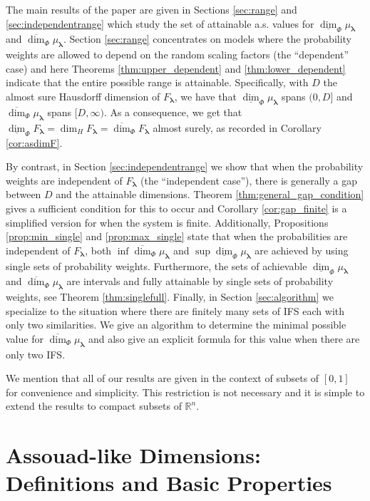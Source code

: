 \documentclass{amsart}
\theoremstyle{plain}
\numberwithin{equation}{section}
\newcommand{\R}{{\mathbb R}}
\newcommand{\blambda}{{\boldsymbol{\lambda}}}
\newcommand{\odim}{\overline{\dim}}
\newcommand{\udim}{\underline{\dim}}
\begin{document}
The main results of the paper are given in Sections \ref{sec:range} and \ref{sec:independentrange} which study the set of attainable a.s. values for $\udim_\Phi \mu_\blambda$ and $\odim_\Phi \mu_\blambda$.
Section \ref{sec:range} concentrates on models where the probability weights are allowed to depend on the random scaling factors (the ``dependent'' case) and here 
Theorems \ref{thm:upper_dependent} and \ref{thm:lower_dependent} indicate that the entire possible range is attainable.
Specifically, with $D$ the almost sure Hausdorff dimension of $F_\blambda$, we have that $\udim_\Phi \mu_\blambda$ spans $(0,D]$ and $\odim_\Phi \mu_\blambda$ spans $[D,\infty)$.
As a consequence, we get that $\udim_\Phi F_\blambda = \dim_H F_\blambda = \odim_\Phi F_\blambda$ almost surely, as recorded in Corollary \ref{cor:asdimF}.

By contrast, in Section \ref{sec:independentrange} we show that when the probability weights are independent of $F_\blambda$ (the ``independent case''), there is generally a gap between $D$ and the attainable dimensions. 
Theorem \ref{thm:general_gap_condition} gives a sufficient condition for this to occur and Corollary \ref{cor:gap_finite} is a simplified version
for when the system is finite.
Additionally, Propositions \ref{prop:min_single} and \ref{prop:max_single} state that when the probabilities are independent of $F_\blambda$, both $\inf \odim_\Phi \mu_\blambda$ and $\sup \udim_\Phi \mu_\blambda$ are achieved by using single sets of probability weights.
Furthermore, the sets of achievable $\udim_\Phi \mu_\blambda$ and $\odim_\Phi \mu_\blambda$ are intervals and fully attainable by single sets of probability weights, see Theorem \ref{thm:singlefull}.
Finally, in Section \ref{sec:algorithm} we specialize to the situation where there are finitely many sets of IFS each with only two similarities.
We give an algorithm to determine the minimal possible value for $\odim_\Phi \mu_\blambda$ and also give an explicit formula for this value
when there are only two IFS.


We mention that all of our results are given in the context of subsets of $[0,1]$ for convenience and simplicity.
This restriction is not necessary and it is simple to extend the results to compact subsets of $\R^n$.



\section{Assouad-like Dimensions: Definitions and Basic Properties}
\end{document}
